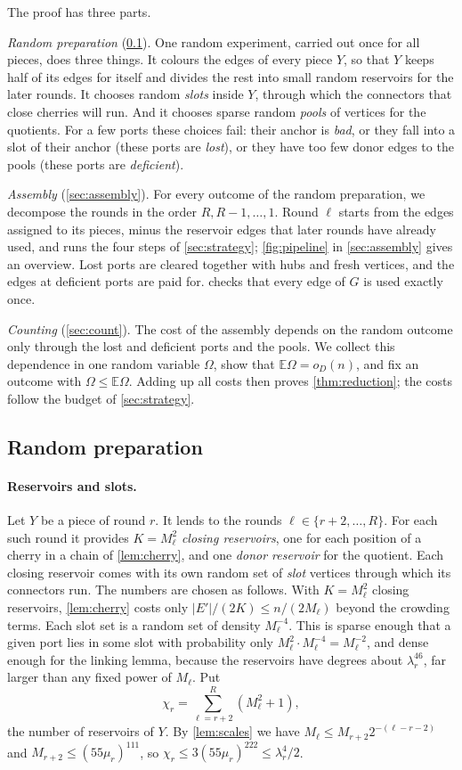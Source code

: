 \documentclass[11pt]{article}
\theoremstyle{definition}
\theoremstyle{remark}
\numberwithin{equation}{section}
\numberwithin{figure}{section}
\numberwithin{table}{section}
\newcommand{\E}{\mathbb{E}}
\newcommand{\oD}{o_D(n)}
\begin{document}
The proof has three parts.

\emph{Random preparation} (\cref{sec:random}). One random experiment, carried
out once for all pieces, does three things. It colours the edges of every
piece $Y$, so that $Y$ keeps half of its edges for itself and divides the rest
into small random reservoirs for the later rounds. It chooses random
\emph{slots} inside $Y$, through which the connectors that close cherries will
run. And it chooses sparse random \emph{pools} of vertices for the quotients.
For a few ports these choices fail: their anchor is \emph{bad}, or they fall
into a slot of their anchor (these ports are \emph{lost}), or they have too few
donor edges to the pools (these ports are \emph{deficient}).

\emph{Assembly} (\cref{sec:assembly}). For every outcome of the random
preparation, we decompose the rounds in the order $R,R-1,\dots,1$. Round $\ell$
starts from the edges assigned to its pieces, minus the reservoir edges that
later rounds have already used, and runs the four steps of
\cref{sec:strategy}; \cref{fig:pipeline} in \cref{sec:assembly} gives an
overview. Lost ports are cleared together with
hubs and fresh vertices, and the edges at deficient ports are paid for.
 checks that every edge of $G$ is used exactly once.

\emph{Counting} (\cref{sec:count}). The cost of the assembly depends on the
random outcome only through the lost and deficient ports and the pools. We
collect this dependence in one random variable $\Omega$, show that
$\E\Omega=\oD$, and fix an outcome with $\Omega\le\E\Omega$. Adding up all
costs then proves \cref{thm:reduction}; the costs follow the budget of
\cref{sec:strategy}.


\subsection{Random preparation}\label{sec:random}

\paragraph{Reservoirs and slots.} Let $Y$ be a piece of round $r$. It lends to
the rounds $\ell\in\{r+2,\dots,R\}$. For each such round it provides
$K=M_\ell^2$ \emph{closing reservoirs}, one for each position of a cherry in a
chain of \cref{lem:cherry}, and one \emph{donor reservoir} for the quotient.
Each closing reservoir comes with its own random set of \emph{slot} vertices
through which its connectors run. The numbers are chosen as follows. With
$K=M_\ell^2$ closing reservoirs, \cref{lem:cherry} costs only
$|E'|/(2K)\le n/(2M_\ell)$ beyond the crowding terms. Each slot set is a random
set of density $M_\ell^{-4}$. This is sparse enough that a given port lies in
some slot with probability only $M_\ell^2\cdot M_\ell^{-4}=M_\ell^{-2}$, and
dense enough for the linking lemma, because the reservoirs have degrees about
$\lambda_r^{46}$, far larger than any fixed power of $M_\ell$. Put
\[
\chi_r=\sum_{\ell=r+2}^R(M_\ell^2+1),
\]
the number of reservoirs of $Y$. By \cref{lem:scales} we have
$M_\ell\le M_{r+2}2^{-(\ell-r-2)}$ and $M_{r+2}\le(55\mu_r)^{111}$, so
$\chi_r\le3(55\mu_r)^{222}\le\lambda_r^4/2$.
\end{document}
